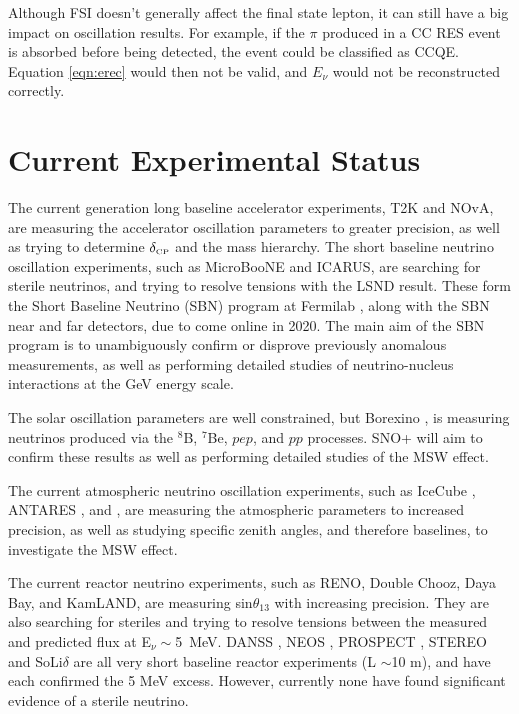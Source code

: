 Although FSI doesn't generally affect the final state lepton, it can still have a big impact on oscillation results. For example, if the $\pi$ produced in a CC RES event is absorbed before being detected, the event could be classified as CCQE. Equation \eqref{eqn:erec} would then not be valid, and $E_\nu$ would not be reconstructed correctly. 

\section{Current Experimental Status}\label{sec:status}

The current generation long baseline accelerator experiments, T2K and NOvA, are measuring the accelerator oscillation parameters to greater precision, as well as trying to determine $\delta_{\scriptscriptstyle\mathrm{CP}}$ and the mass hierarchy. The short baseline neutrino oscillation experiments, such as MicroBooNE \cite{microboone} and ICARUS, are searching for sterile neutrinos, and trying to resolve tensions with the LSND result. These form the Short Baseline Neutrino (SBN) program at Fermilab \cite{sbn}, along with the SBN near and far detectors, due to come online in 2020. The main aim of the SBN program is to unambiguously confirm or disprove previously anomalous measurements, as well as performing detailed studies of neutrino-nucleus interactions at the GeV energy scale.

The solar oscillation parameters are well constrained, but Borexino \cite{borexino}, is measuring neutrinos produced via the $^8$B, $^7$Be, $pep$, and $pp$ processes. SNO+ \cite{snoplus} will aim to confirm these results as well as performing detailed studies of the MSW effect.

The current atmospheric neutrino oscillation experiments, such as IceCube \cite{icecube}, ANTARES \cite{antares}, and \SK, are measuring the atmospheric parameters to increased precision, as well as studying specific zenith angles, and therefore baselines, to investigate the MSW effect.

The current reactor neutrino experiments, such as RENO, Double Chooz, Daya Bay, and KamLAND, are measuring sin$\theta_{13}$ with increasing precision. They are also searching for steriles and trying to resolve tensions between the measured and predicted flux at E$_\nu\sim$5~MeV. DANSS \cite{danss}, NEOS \cite{neos}, PROSPECT \cite{prospect}, STEREO \cite{stereo} and SoLi$\delta$ \cite{solid} are all very short baseline reactor experiments (L $\sim$10 m), and have each confirmed the 5 MeV excess. However, currently none have found significant evidence of a sterile neutrino.

